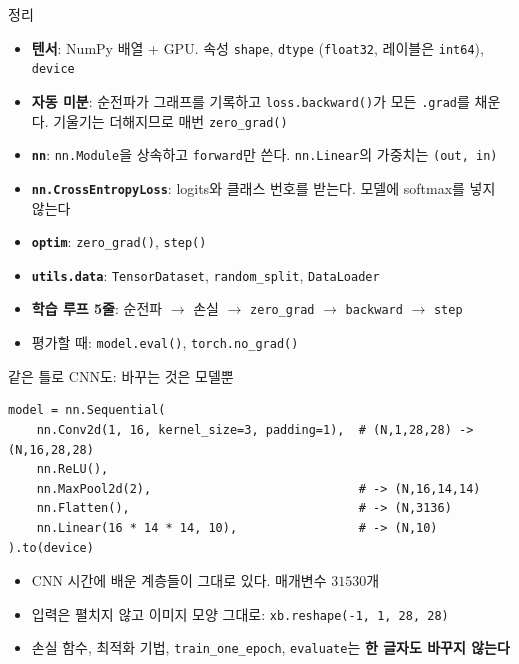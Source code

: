 \documentclass[aspectratio=169,11pt]{beamer}
\newcommand{\code}[1]{\texttt{#1}}
\begin{document}
\begin{frame}{정리}
\begin{keybox}[이번 시간의 핵심]
\small
\begin{itemize}\setlength{\itemsep}{0.6mm}
\item \textbf{텐서}: NumPy 배열 + GPU. 속성 \code{shape}, \code{dtype} (\code{float32}, 레이블은 \code{int64}), \code{device}
\item \textbf{자동 미분}: 순전파가 그래프를 기록하고 \code{loss.backward()}가 모든 \code{.grad}를 채운다.
기울기는 더해지므로 매번 \code{zero\_grad()}
\item \textbf{\code{nn}}: \code{nn.Module}을 상속하고 \code{forward}만 쓴다. \code{nn.Linear}의 가중치는 \code{(out, in)}
\item \textbf{\code{nn.CrossEntropyLoss}}: logits와 클래스 번호를 받는다. 모델에 softmax를 넣지 않는다
\item \textbf{\code{optim}}: \code{zero\_grad()}, \code{step()}
\item \textbf{\code{utils.data}}: \code{TensorDataset}, \code{random\_split}, \code{DataLoader}
\item \textbf{학습 루프 5줄}: 순전파 $\to$ 손실 $\to$ \code{zero\_grad} $\to$ \code{backward} $\to$ \code{step}
\item 평가할 때: \code{model.eval()}, \code{torch.no\_grad()}
\end{itemize}
\end{keybox}
\end{frame}

\begin{frame}[fragile]{같은 틀로 CNN도: 바꾸는 것은 모델뿐}
\begin{lstlisting}
model = nn.Sequential(
    nn.Conv2d(1, 16, kernel_size=3, padding=1),  # (N,1,28,28) -> (N,16,28,28)
    nn.ReLU(),
    nn.MaxPool2d(2),                             # -> (N,16,14,14)
    nn.Flatten(),                                # -> (N,3136)
    nn.Linear(16 * 14 * 14, 10),                 # -> (N,10)
).to(device)
\end{lstlisting}
\begin{itemize}
\item CNN 시간에 배운 계층들이 그대로 있다. 매개변수 $31530$개
\item 입력은 펼치지 않고 이미지 모양 그대로: \code{xb.reshape(-1, 1, 28, 28)}
\item 손실 함수, 최적화 기법, \code{train\_one\_epoch}, \code{evaluate}는 \textbf{한 글자도 바꾸지 않는다}
\end{itemize}
\end{frame}
\end{document}
